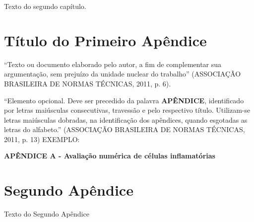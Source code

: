 \documentclass[
        12pt,
        openany, %
        oneside, %
        a4paper,
        english,
        brazil			        %
        ]{abntbibufjf}
\begin{document}
Texto do segundo cap\'itulo.




\postextual

\medskip









\begin{apendicesenv}

\chapter{T\'itulo do Primeiro Ap\^endice}

``Texto ou documento elaborado pelo autor, a fim de complementar sua argumenta\c{c}\~ao,
sem preju\'izo da unidade nuclear do trabalho''
(ASSOCIA\c{C}\~AO BRASILEIRA DE NORMAS T\'ECNICAS, 2011, p. 6).

``Elemento opcional. Deve ser precedido da palavra \textbf{AP\^ENDICE}, identificado por letras mai\'usculas
consecutivas, travess\~ao e pelo respectivo t\'itulo. Utilizam-se letras mai\'usculas dobradas,
na identifica\c{c}\~ao dos ap\^endices, quando esgotadas as letras do alfabe\-to.''
(ASSOCIA\c{C}\~AO BRASILEIRA DE NORMAS T\'ECNICAS, 2011, p. 13)
\newline
EXEMPLO:
\begin{center}
\textbf{AP\^ENDICE A - Avalia\c{c}\~ao num\'erica de c\'elulas inflamat\'orias}
\end{center}


\chapter{Segundo Ap\^endice}
Texto do Segundo Ap\^endice
\end{apendicesenv}

\end{document}
